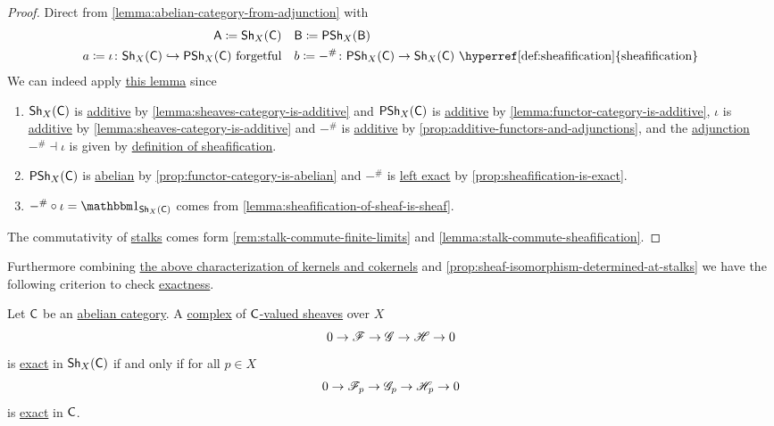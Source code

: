 \documentclass[../../main]{subfiles}
\begin{document}
\begin{proof}
  Direct from \autoref{lemma:abelian-category-from-adjunction} with
  \begin{align*}
    \category{A} \coloneq \Sh_{X}(\category{C}) &\quad \category{B} \coloneq \PSh_{X}(\category{B}) \\
    a \coloneq \iota\colon \Sh_{X}(\category{C}) \hookrightarrow \PSh_{X}(\category{C}) \text{ forgetful} &\quad b \coloneq -^{\#}\colon \PSh_{X}(\category{C}) \to \Sh_{X}(\category{C}) \text{ \hyperref[def:sheafification]{sheafification}}
  \end{align*}
  We can indeed apply \hyperref[lemma:abelian-category-from-adjunction]{this lemma} since
  \begin{enumerate}
    \item \(\mathsf{Sh}_{X}(\mathsf{C})\) is \hyperref[def:additive-category]{additive} by \autoref{lemma:sheaves-category-is-additive} and \(\mathsf{PSh}_{X}(\mathsf{C})\) is \hyperref[def:additive-category]{additive} by \autoref{lemma:functor-category-is-additive}, \(\iota\) is \hyperref[def:additive-functor]{additive} by \autoref{lemma:sheaves-category-is-additive} and \(-^{\#}\) is \hyperref[def:additive-functor]{additive} by \autoref{prop:additive-functors-and-adjunctions}, and the \hyperref[def:adjoint-functors]{adjunction} \(-^{\#} \dashv \iota\) is given by \hyperref[def:sheafification]{definition of sheafification}.
    \item \(\mathsf{PSh}_{X}(\mathsf{C})\) is \hyperref[def:abelian-category]{abelian} by \autoref{prop:functor-category-is-abelian} and \(-^{\#}\) is \hyperref[def:exact-functor]{left exact} by \autoref{prop:sheafification-is-exact}.
    \item \(-^{\#} \circ \iota = \id_{\Sh_{X}(\category{C})}\) comes from \autoref{lemma:sheafification-of-sheaf-is-sheaf}.
  \end{enumerate}

  The commutativity of \hyperref[def:stalk]{stalks} comes form \autoref{rem:stalk-commute-finite-limits} and \autoref{lemma:stalk-commute-sheafification}.
\end{proof}

Furthermore combining \hyperref[thm:sheaf-category-is-abelian]{the above characterization of kernels and cokernels} and \autoref{prop:sheaf-isomorphism-determined-at-stalks} we have the following criterion to check \hyperref[def:exact-sequence]{exactness}.
\begin{corollary}\label{cor:exactness-at-stalks}
  Let \(\mathsf{C}\) be an \hyperref[def:abelian-category]{abelian category}.
  A \hyperref[def:complex]{complex} of \hyperref[def:sheaf]{\(\mathsf{C}\)-valued sheaves} over \(X\)
  \begin{equation*}
    0 \to \mathscr{F} \to \mathscr{G} \to \mathscr{H} \to 0
  \end{equation*}
  is \hyperref[def:exact-sequence]{exact} in \(\mathsf{Sh}_{X}(\mathsf{C})\) if and only if for all \(p \in X\)
  \begin{equation*}
    0 \to \mathscr{F}_{p} \to \mathscr{G}_{p} \to \mathscr{H}_{p} \to 0
  \end{equation*}
   is \hyperref[def:exact-sequence]{exact} in \(\mathsf{C}\).
\end{corollary}
\end{document}
